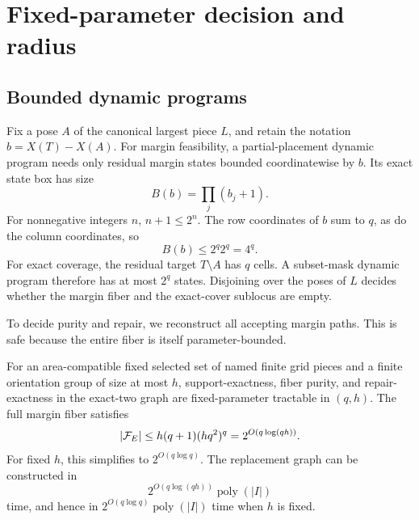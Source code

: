 \section{Fixed-parameter decision and radius}\label{sec:fpt}

\subsection{Bounded dynamic programs}

Fix a pose \(A\) of the canonical largest piece \(L\), and retain the
notation \(b=X(T)-X(A)\).  For margin feasibility, a partial-placement
dynamic program needs only residual margin states bounded coordinatewise by
\(b\).  Its exact state box has size
\[
  B(b)=\prod_j(b_j+1).
\]
For nonnegative integers \(n\), \(n+1\leq2^n\).  The row coordinates of
\(b\) sum to \(q\), as do the column coordinates, so
\[
  B(b)\leq 2^q2^q=4^q.
\]
For exact coverage, the residual target \(T\setminus A\) has \(q\) cells.
A subset-mask dynamic program therefore has at most \(2^q\) states.
Disjoining over the poses of \(L\) decides whether the margin fiber and the
exact-cover sublocus are empty.

To decide purity and repair, we reconstruct all accepting margin paths.  This
is safe because the entire fiber is itself parameter-bounded.

\begin{theorem}\label{thm:fpt}
For an area-compatible fixed selected set of named finite grid pieces and a
finite orientation group of size at most \(h\), support-exactness, fiber
purity, and repair-exactness in the exact-two graph are fixed-parameter
tractable in \((q,h)\).  The full margin fiber satisfies
\[
 |\mathcal F_E|\leq h(q+1)(h q^2)^q
              =2^{O(q\log(qh))}.
\]
For fixed \(h\), this simplifies to \(2^{O(q\log q)}\).  The replacement
graph can be constructed in
\[
 2^{O(q\log(qh))}\operatorname{poly}(|I|)
\]
time, and hence in \(2^{O(q\log q)}\operatorname{poly}(|I|)\) time when
\(h\) is fixed.
\end{theorem}

